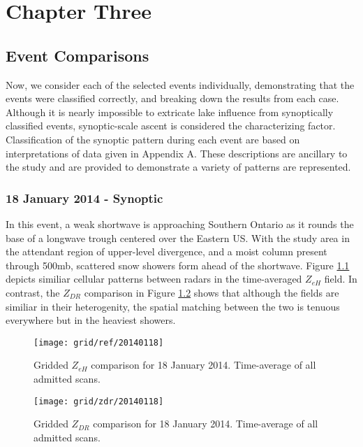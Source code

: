 \chapter{Chapter Three}

\section{Event Comparisons}
Now, we consider each of the selected events individually, demonstrating that the events were
classified correctly, and breaking down the results from each case. Although it is nearly impossible to
extricate lake influence from synoptically classified events, synoptic-scale ascent is considered the
characterizing factor. Classification of the synoptic pattern during each event are based on interpretations of data given in Appendix A. 
These descriptions are ancillary to the study and are provided to demonstrate a variety of patterns are represented.

\subsection{18 January 2014 - Synoptic}
In this event, a weak shortwave is approaching Southern Ontario as it rounds the base of a longwave
trough centered over the Eastern US. With the study area in the attendant
region of upper-level divergence, and a moist column present through 500mb, 
scattered snow showers form ahead of the shortwave. Figure \ref{fig:grid_ref_20140118} depicts
similiar cellular patterns between radars in the time-averaged $Z_{eH}$ field. In contrast, the $Z_{DR}$
comparison in Figure \ref{fig:grid_zdr_20140118}
shows that although the fields are similiar in their heterogenity, the spatial matching between the two is
tenuous everywhere but in the heaviest showers.

\begin{figure}[H]
\texttt{[image: grid/ref/20140118]}
\caption{Gridded $Z_{eH}$ comparison for 18 January 2014. Time-average of all admitted scans.} 
\label{fig:grid_ref_20140118}
\end{figure}

\begin{figure}[H]
\texttt{[image: grid/zdr/20140118]}
\caption{Gridded $Z_{DR}$ comparison for 18 January 2014. Time-average of all admitted scans.} 
\label{fig:grid_zdr_20140118}
\end{figure}
\vspace{5mm}

